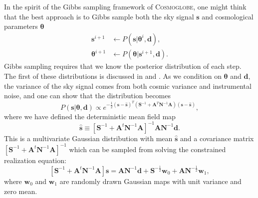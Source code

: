 \documentclass[twocolumn]{../common/aa}
\newcommand{\cosmoglobe}{\textsc{Cosmoglobe}}
\begin{document}
In the spirit of the Gibbs sampling framework of \cosmoglobe, one might think that the best approach is to Gibbs sample both the sky signal $\boldsymbol{s}$ and cosmological parameters $\boldsymbol{\theta}$
\begin{align}
    \boldsymbol{s}^{i+1} &\leftarrow P(\boldsymbol{s} | \boldsymbol{\theta}^{i}, \boldsymbol{d}),\\
    \label{eq:theta-gibbs}
    \boldsymbol{\theta}^{i+1} &\leftarrow P(\boldsymbol{\theta} | \boldsymbol{s}^{i+1}, \boldsymbol{d}).
\end{align}
Gibbs sampling requires that we know the posterior distribution of each step. The first of these distributions is discussed in \cite{jewell2004} and \cite{wandelt2004}. As we condition on $\boldsymbol{\theta}$ and $\boldsymbol{d}$, the variance of the sky signal comes from both cosmic variance and instrumental noise, and one can show that the distribution becomes
\begin{equation}
    P(\boldsymbol{s} | \boldsymbol{\theta}, \boldsymbol{d}) \propto e^{-\frac12 \left(\boldsymbol{s} - \boldsymbol{\hat{s}}\right)^T \left(\boldsymbol{S}^{-1} + \boldsymbol{A}^T\boldsymbol{N}^{-1}\boldsymbol{A}\right) \left(\boldsymbol{s} - \boldsymbol{\hat{s}}\right)},
\end{equation}
where we have defined the deterministic mean field map
\begin{equation}
\label{eq:mean-field-map}
\boldsymbol{\hat{s}} \equiv \left[\boldsymbol{S}^{-1} + \boldsymbol{A}^t \boldsymbol{N}^{-1}\boldsymbol{A} \right]^{-1} \boldsymbol{A} \boldsymbol{N}^{-1} \boldsymbol{d}.
\end{equation}
This is a multivariate Gaussian distribution with mean $\boldsymbol{\hat{s}}$ and a covariance matrix $\left[\boldsymbol{S}^{-1} + \boldsymbol{A}^t \boldsymbol{N}^{-1}\boldsymbol{A} \right]^{-1}$ which can be sampled from solving the constrained realization equation:
\begin{equation}
    \label{eq:mapmakingeq}
    \left[\boldsymbol{S}^{-1} + \boldsymbol{A}^t \boldsymbol{N}^{-1}\boldsymbol{A} \right]\boldsymbol{s} = \boldsymbol{A} \boldsymbol{N}^{-1} \boldsymbol{d} + \boldsymbol{S}^{-\frac{1}{2}}\boldsymbol{w}_0 +\boldsymbol{A N}^{-\frac{1}{2}}\boldsymbol{w}_1,
\end{equation}
where $\boldsymbol{w}_0$ and $\boldsymbol{w}_1$ are randomly drawn Gaussian maps with unit variance and zero mean.
\end{document}
